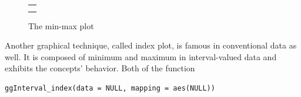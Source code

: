 \documentclass[article]{jss}
\begin{document}
\begin{figure}[htbp]
    \centering
    \begin{tabular}{c}
                \\
        \end{tabular}
   \caption{\label{fig:minmax} The min-max plot}
\end{figure}


Another graphical technique, called index plot, is famous in conventional data as well. It is composed of minimum and maximum in interval-valued data and exhibits the concepts' behavior. Both of the function

\begin{verbatim}
ggInterval_index(data = NULL, mapping = aes(NULL))
\end{verbatim}
\end{document}
